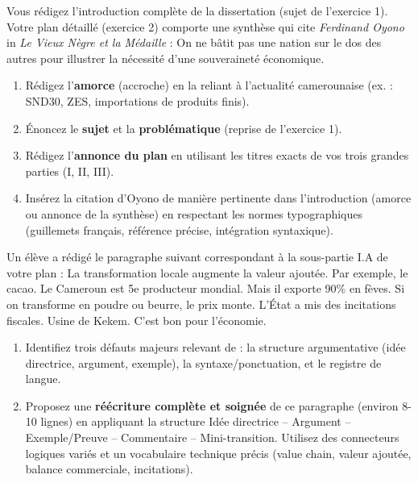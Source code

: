 \documentclass[11pt]{article}
\begin{document}
\begin{exercice}
Vous rédigez l'introduction complète de la dissertation (sujet de l'exercice 1). Votre plan détaillé (exercice 2) comporte une synthèse qui cite \textit{Ferdinand Oyono} in \textit{Le Vieux Nègre et la Médaille} : \og{} On ne bâtit pas une nation sur le dos des autres \fg{} pour illustrer la nécessité d'une souveraineté économique.

\begin{enumerate}
    \item Rédigez l'\textbf{amorce} (accroche) en la reliant à l'actualité camerounaise (ex. : SND30, ZES, importations de produits finis).
    \item Énoncez le \textbf{sujet} et la \textbf{problématique} (reprise de l'exercice 1).
    \item Rédigez l'\textbf{annonce du plan} en utilisant les titres exacts de vos trois grandes parties (I, II, III).
    \item Insérez la citation d'Oyono de manière pertinente dans l'introduction (amorce ou annonce de la synthèse) en respectant les normes typographiques (guillemets français, référence précise, intégration syntaxique).
\end{enumerate}
\end{exercice}

\begin{exercice}
Un élève a rédigé le paragraphe suivant correspondant à la sous-partie I.A de votre plan : \og{} La transformation locale augmente la valeur ajoutée. Par exemple, le cacao. Le Cameroun est 5e producteur mondial. Mais il exporte 90\% en fèves. Si on transforme en poudre ou beurre, le prix monte. L'État a mis des incitations fiscales. Usine de Kekem. C'est bon pour l'économie. \fg{}

\begin{enumerate}
    \item Identifiez trois défauts majeurs relevant de : la structure argumentative (idée directrice, argument, exemple), la syntaxe/ponctuation, et le registre de langue.
    \item Proposez une \textbf{réécriture complète et soignée} de ce paragraphe (environ 8-10 lignes) en appliquant la structure \og{}Idée directrice -- Argument -- Exemple/Preuve -- Commentaire -- Mini-transition\fg{}. Utilisez des connecteurs logiques variés et un vocabulaire technique précis (value chain, valeur ajoutée, balance commerciale, incitations).
\end{enumerate}
\end{exercice}
\end{document}

